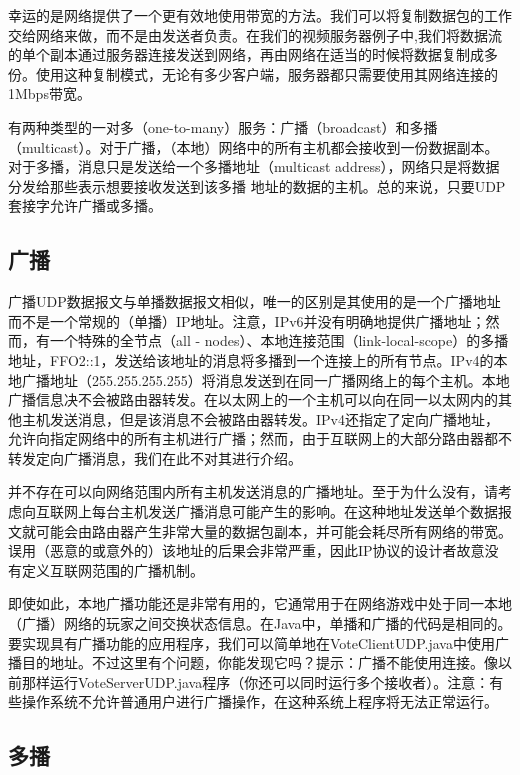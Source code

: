 	幸运的是网络提供了一个更有效地使用带宽的方法。我们可以将复制数据包的工作交给网络来做，而不是由发送者负责。在我们的视频服务器例子中,我们将数据流的单个副本通过服务器连接发送到网络，再由网络在适当的时候将数据复制成多份。使用这种复制模式，无论有多少客户端，服务器都只需要使用其网络连接的1Mbps带宽。 

	有两种类型的一对多（one-to-many）服务：广播（broadcast）和多播（multicast）。对于广播，（本地）网络中的所有主机都会接收到一份数据副本。对于多播，消息只是发送给一个多播地址（multicast address），网络只是将数据分发给那些表示想要接收发送到该多播
	地址的数据的主机。总的来说，只要UDP套接字允许广播或多播。 

	\subsection{广播} 

		广播UDP数据报文与单播数据报文相似，唯一的区别是其使用的是一个广播地址而不是一个常规的（单播）IP地址。注意，IPv6并没有明确地提供广播地址；然而，有一个特殊的全节点（all - nodes）、本地连接范围（link-local-scope）的多播地址，FFO2::1，发送给该地址的消息将多播到一个连接上的所有节点。IPv4的本地广播地址（255.255.255.255）将消息发送到在同一广播网络上的每个主机。本地广播信息决不会被路由器转发。在以太网上的一个主机可以向在同一以太网内的其他主机发送消息，但是该消息不会被路由器转发。IPv4还指定了定向广播地址，允许向指定网络中的所有主机进行广播；然而，由于互联网上的大部分路由器都不转发定向广播消息，我们在此不对其进行介绍。 

		并不存在可以向网络范围内所有主机发送消息的广播地址。至于为什么没有，请考虑向互联网上每台主机发送广播消息可能产生的影响。在这种地址发送单个数据报文就可能会由路由器产生非常大量的数据包副本，并可能会耗尽所有网络的带宽。误用（恶意的或意外的）该地址的后果会非常严重，因此IP协议的设计者故意没有定义互联网范围的广播机制。 

		即使如此，本地广播功能还是非常有用的，它通常用于在网络游戏中处于同一本地（广播）网络的玩家之间交换状态信息。在Java中，单播和广播的代码是相同的。要实现具有广播功能的应用程序，我们可以简单地在VoteClientUDP.java中使用广播目的地址。不过这里有个问题，你能发现它吗？提示：广播不能使用连接。像以前那样运行VoteServerUDP.java程序（你还可以同时运行多个接收者）。注意：有些操作系统不允许普通用户进行广播操作，在这种系统上程序将无法正常运行。 

	\subsection{多播} 

